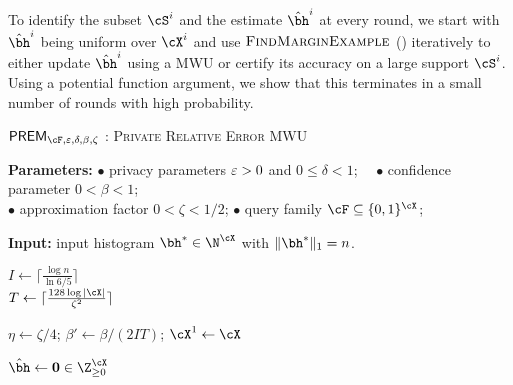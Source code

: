To identify the subset $\cS^i$ and the estimate $\hbh^i$ at every round, we start with $\hbh^i$ being uniform over $\cX^i$ and use $\textsc{FindMarginExample}$ () iteratively to either update $\hbh^i$ using a MWU or certify its accuracy on a large support $\cS^i$. Using a potential function argument, we show that this terminates in a small number of rounds with high probability.
\begin{algorithm}[t]
\small
    \caption{$\PREM_{\cF,\eps,\delta,\beta,\zeta}$ : \textsc{Private Relative Error MWU}}
    \label{alg:dp-mwu}
        \textbf{Parameters:}
            {\footnotesize $\bullet$ } privacy parameters $\varepsilon > 0$ and $0 \leq \delta < 1$;
            \ \ {\footnotesize $\bullet$ } confidence parameter $0 < \beta < 1$;\\
            {\footnotesize $\bullet$ } approximation factor $0 < \zeta < 1 / 2$;
            \quad \quad \quad
            {\footnotesize $\bullet$ } query family $\cF\subseteq \{0, 1\}^{\cX}$;

        \textbf{Input:} input histogram $\bh^{\ast} \in \N^{\cX}$ with $\|\bh^{\ast}\|_1=n$.
        
        $I \gets \lceil \frac{\log n}{\ln 6/5}\rceil$\\
        $T \gets \lceil\frac{128\log |\cX|}{\zeta^2}\rceil$

        $\eta\gets \zeta/4$; $\beta'\gets \beta/(2IT)$; $\cX^1 \gets \cX$
        

        $\hbh \gets {\bm 0} \in \Z_{\ge 0}^{\cX}$


\end{algorithm}
